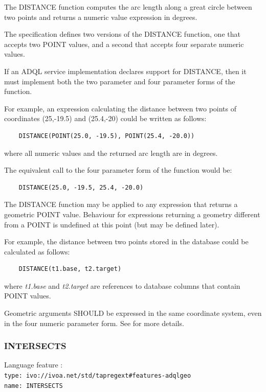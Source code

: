 \documentclass[11pt,a4paper]{ivoa}
\begin{document}
The DISTANCE function computes the arc length along a great circle between two
points and returns a numeric value expression in degrees.

The specification defines two versions of the DISTANCE function, one that
accepts two POINT values, and a second that accepts four separate numeric
values.

If an ADQL service implementation declares support for DISTANCE,
then it must implement both the two parameter and four parameter
forms of the function.

For example, an expression calculating the distance between two points of
coordinates (25,-19.5) and (25.4,-20) could be written as follows:
\begin{verbatim}
    DISTANCE(POINT(25.0, -19.5), POINT(25.4, -20.0))
\end{verbatim}
\noindent
where all numeric values and the returned arc length are in degrees.

The equivalent call to the four parameter form of the function would be:
\begin{verbatim}
    DISTANCE(25.0, -19.5, 25.4, -20.0)
\end{verbatim}

The DISTANCE function may be applied to any expression that returns a
geometric POINT value. Behaviour for expressions returning a geometry different
from a POINT is undefined at this point (but may be defined later).

For example, the distance between two points stored in the database could
be calculated as follows:
\begin{verbatim}
    DISTANCE(t1.base, t2.target)
\end{verbatim}
\noindent
where \textit{t1.base} and \textit{t2.target} are references to
database columns that contain POINT values.

Geometric arguments SHOULD be expressed in the same coordinate system, even in
the four numeric parameter form. See  for
more details.

\subsubsection{INTERSECTS}
\label{sec:functions.geom.intersects}
{\footnotesize Language feature :}\\
{\footnotesize \verb|type: ivo://ivoa.net/std/tapregext#features-adqlgeo|}\\
{\footnotesize \verb|name: INTERSECTS|}\\
\end{document}
